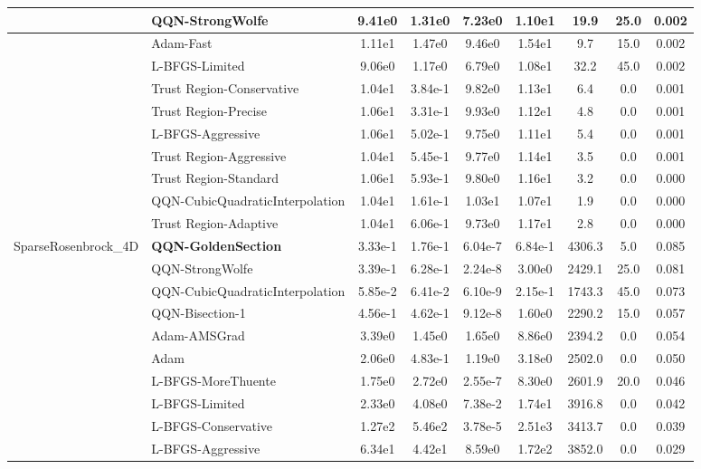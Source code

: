 \documentclass{article}
\begin{document}
\begin{longtable}{|l|l|c|c|c|c|c|c|c|}
\hline
 & QQN-StrongWolfe & 9.41e0 & 1.31e0 & 7.23e0 & 1.10e1 & 19.9 & 25.0 & 0.002 \\
\hline
 & Adam-Fast & 1.11e1 & 1.47e0 & 9.46e0 & 1.54e1 & 9.7 & 15.0 & 0.002 \\
\hline
 & L-BFGS-Limited & 9.06e0 & 1.17e0 & 6.79e0 & 1.08e1 & 32.2 & 45.0 & 0.002 \\
\hline
 & Trust Region-Conservative & 1.04e1 & 3.84e-1 & 9.82e0 & 1.13e1 & 6.4 & 0.0 & 0.001 \\
\hline
 & Trust Region-Precise & 1.06e1 & 3.31e-1 & 9.93e0 & 1.12e1 & 4.8 & 0.0 & 0.001 \\
\hline
 & L-BFGS-Aggressive & 1.06e1 & 5.02e-1 & 9.75e0 & 1.11e1 & 5.4 & 0.0 & 0.001 \\
\hline
 & Trust Region-Aggressive & 1.04e1 & 5.45e-1 & 9.77e0 & 1.14e1 & 3.5 & 0.0 & 0.001 \\
\hline
 & Trust Region-Standard & 1.06e1 & 5.93e-1 & 9.80e0 & 1.16e1 & 3.2 & 0.0 & 0.000 \\
\hline
 & QQN-CubicQuadraticInterpolation & 1.04e1 & 1.61e-1 & 1.03e1 & 1.07e1 & 1.9 & 0.0 & 0.000 \\
\hline
 & Trust Region-Adaptive & 1.04e1 & 6.06e-1 & 9.73e0 & 1.17e1 & 2.8 & 0.0 & 0.000 \\
SparseRosenbrock\_4D & \textbf{QQN-GoldenSection} & 3.33e-1 & 1.76e-1 & 6.04e-7 & 6.84e-1 & 4306.3 & 5.0 & 0.085 \\
\hline
 & QQN-StrongWolfe & 3.39e-1 & 6.28e-1 & 2.24e-8 & 3.00e0 & 2429.1 & 25.0 & 0.081 \\
\hline
 & QQN-CubicQuadraticInterpolation & 5.85e-2 & 6.41e-2 & 6.10e-9 & 2.15e-1 & 1743.3 & 45.0 & 0.073 \\
\hline
 & QQN-Bisection-1 & 4.56e-1 & 4.62e-1 & 9.12e-8 & 1.60e0 & 2290.2 & 15.0 & 0.057 \\
\hline
 & Adam-AMSGrad & 3.39e0 & 1.45e0 & 1.65e0 & 8.86e0 & 2394.2 & 0.0 & 0.054 \\
\hline
 & Adam & 2.06e0 & 4.83e-1 & 1.19e0 & 3.18e0 & 2502.0 & 0.0 & 0.050 \\
\hline
 & L-BFGS-MoreThuente & 1.75e0 & 2.72e0 & 2.55e-7 & 8.30e0 & 2601.9 & 20.0 & 0.046 \\
\hline
 & L-BFGS-Limited & 2.33e0 & 4.08e0 & 7.38e-2 & 1.74e1 & 3916.8 & 0.0 & 0.042 \\
\hline
 & L-BFGS-Conservative & 1.27e2 & 5.46e2 & 3.78e-5 & 2.51e3 & 3413.7 & 0.0 & 0.039 \\
\hline
 & L-BFGS-Aggressive & 6.34e1 & 4.42e1 & 8.59e0 & 1.72e2 & 3852.0 & 0.0 & 0.029 \\

\end{longtable}
\end{document}
